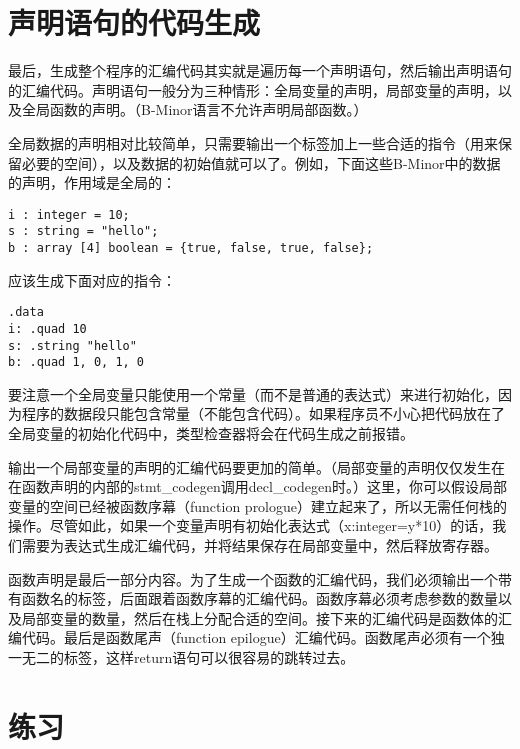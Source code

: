 \documentclass[cn,11pt,chinese]{elegantbook}
\begin{document}
\section{声明语句的代码生成}

最后，生成整个程序的汇编代码其实就是遍历每一个声明语句，然后输出声明语句的汇编代码。声明语句一般分为三种情形：全局变量的声明，局部变量的声明，以及全局函数的声明。（B-Minor语言不允许声明局部函数。）

全局数据的声明相对比较简单，只需要输出一个标签加上一些合适的指令（用来保留必要的空间），以及数据的初始值就可以了。例如，下面这些B-Minor中的数据的声明，作用域是全局的：

\begin{verbatim}
i : integer = 10;
s : string = "hello";
b : array [4] boolean = {true, false, true, false};
\end{verbatim}

应该生成下面对应的指令：

\begin{verbatim}
.data
i: .quad 10
s: .string "hello"
b: .quad 1, 0, 1, 0
\end{verbatim}

要注意一个全局变量只能使用一个常量（而不是普通的表达式）来进行初始化，因为程序的数据段只能包含常量（不能包含代码）。如果程序员不小心把代码放在了全局变量的初始化代码中，类型检查器将会在代码生成之前报错。

输出一个局部变量的声明的汇编代码要更加的简单。（局部变量的声明仅仅发生在在函数声明的内部的stmt\_codegen调用decl\_codegen时。）这里，你可以假设局部变量的空间已经被函数序幕（function prologue）建立起来了，所以无需任何栈的操作。尽管如此，如果一个变量声明有初始化表达式（x:integer=y*10）的话，我们需要为表达式生成汇编代码，并将结果保存在局部变量中，然后释放寄存器。

函数声明是最后一部分内容。为了生成一个函数的汇编代码，我们必须输出一个带有函数名的标签，后面跟着函数序幕的汇编代码。函数序幕必须考虑参数的数量以及局部变量的数量，然后在栈上分配合适的空间。接下来的汇编代码是函数体的汇编代码。最后是函数尾声（function epilogue）汇编代码。函数尾声必须有一个独一无二的标签，这样return语句可以很容易的跳转过去。

\section{练习}
\end{document}
